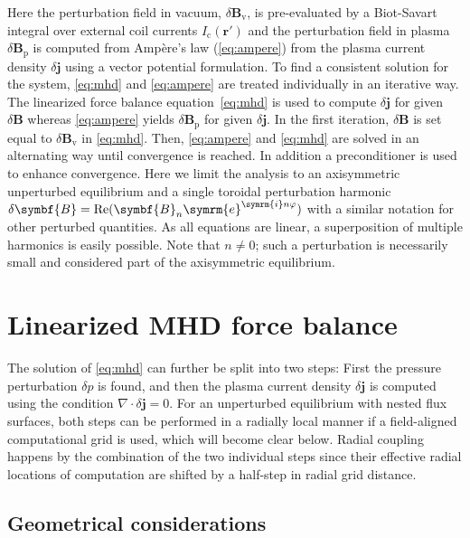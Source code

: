 \documentclass[a4paper, 10pt, english]{article}
\let\temp\vartheta
\let\vartheta\theta
\let\theta\temp
\let\temp\varphi
\let\varphi\phi
\let\phi\temp
\let\vec\symbf
\newcommand*\e{\ensuremath{\symrm{e}}}  %
\newcommand*\im{\ensuremath{\symrm{i}}}  %
\DeclareMathOperator\Real{Re}
\begin{document}
Here the perturbation field in vacuum, $\delta \vec{B}_{\text{v}}$, is pre-evaluated by a Biot-Savart integral over external coil currents $I_{\text{c}}(\vec{r}')$ and the perturbation field in plasma $\delta \vec{B}_{\text{p}}$ is computed from Ampère's law (\ref{eq:ampere}) from the plasma current density $\delta \vec{j}$ using a vector potential formulation. To find a consistent solution for the system, \cref{eq:mhd} and \cref{eq:ampere} are treated individually in an iterative way. The linearized force balance equation~\eqref{eq:mhd} is used to compute $\delta \vec{j}$ for given $\delta \vec{B}$ whereas \cref{eq:ampere} yields $\delta \vec{B}_{\text{p}}$ for given $\delta \vec{j}$. In the first iteration, $\delta \vec{B}$ is set equal to $\delta \vec{B}_{\text{v}}$ in \cref{eq:mhd}. Then, \cref{eq:ampere} and \cref{eq:mhd} are solved in an alternating way until convergence is reached. In addition a preconditioner is used to enhance convergence. Here we limit the analysis to an axisymmetric unperturbed equilibrium and a single toroidal perturbation harmonic $\delta \vec{B} = \Real (\vec{B}_{n} \e^{\im n \phi})$ with a similar notation for other perturbed quantities. As all equations are linear, a superposition of multiple harmonics is easily possible. Note that $n \neq 0$; such a perturbation is necessarily small and considered part of the axisymmetric equilibrium.

\section{Linearized MHD force balance}

The solution of \cref{eq:mhd} can further be split into two steps: First the pressure perturbation $\delta p$ is found, and then the plasma current density $\delta \vec{j}$ is computed using the condition $\nabla \cdot \delta \vec{j} = 0$. For an unperturbed equilibrium with nested flux surfaces, both steps can be performed in a radially local manner if a field-aligned computational grid is used, which will become clear below. Radial coupling happens by the combination of the two individual steps since their effective radial locations of computation are shifted by a half-step in radial grid distance.

\subsection{Geometrical considerations}
\end{document}
